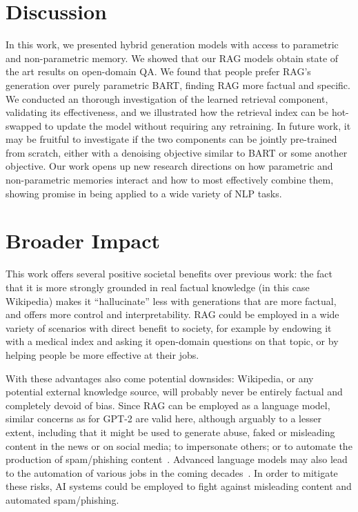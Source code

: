 \documentclass{article}
\begin{document}
 
\section{Discussion}

In this work, we presented hybrid generation models with access to parametric and non-parametric memory.
We showed that our RAG models obtain state of the art results on open-domain QA. We found that people prefer RAG's generation over purely parametric BART, finding RAG more factual and specific.
We conducted an thorough investigation of the learned retrieval component, validating its effectiveness, and we illustrated how the retrieval index can be hot-swapped to update the model without requiring any retraining.
In future work, it may be fruitful to investigate if the two components can be jointly pre-trained from scratch, either with a denoising objective similar to BART or some another objective. 
Our work opens up new research directions on how parametric and non-parametric memories interact and how to most effectively combine them, showing promise in being applied to a wide variety of NLP tasks.










\clearpage 
\section*{Broader Impact}





This work offers several positive societal benefits over previous work: the fact that it is more strongly grounded in real factual knowledge (in this case Wikipedia) makes it ``hallucinate'' less with generations that are more factual, and offers more control and interpretability. RAG could be employed in a wide variety of scenarios with direct benefit to society, for example by endowing it with a medical index and asking it open-domain questions on that topic, or by helping people be more effective at their jobs.

With these advantages also come potential downsides: Wikipedia, or any potential external knowledge source, will probably never be entirely factual and completely devoid of bias. Since RAG can be employed as a language model, similar concerns as for GPT-2 \cite{radford2019language} are valid here, although arguably to a lesser extent, including that it might be used to generate abuse, faked or misleading content in the news or on social media; to impersonate others; or to automate the production of spam/phishing content~\cite{solaiman2019release}. Advanced language models may also lead to the automation of various jobs in the coming decades~\cite{grace2017when}.
In order to mitigate these risks, AI systems could be employed to fight against misleading content and automated spam/phishing.
\end{document}
